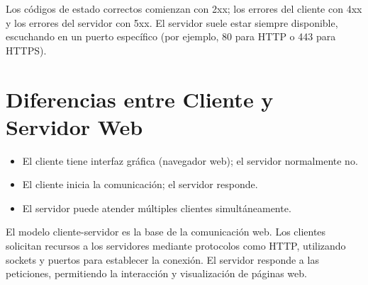 \documentclass[11pt,a4paper]{article}
\begin{document}
    \begin{NotaBox}
        Los códigos de estado correctos comienzan con 2xx; los errores del cliente con 4xx y los errores del servidor con 5xx.
        El servidor suele estar siempre disponible, escuchando en un puerto específico (por ejemplo, 80 para HTTP o 443 para HTTPS).
    \end{NotaBox}

    \section{Diferencias entre Cliente y Servidor Web}
    \begin{itemize}
        \item El cliente tiene interfaz gráfica (navegador web); el servidor normalmente no.
        \item El cliente inicia la comunicación; el servidor responde.
        \item El servidor puede atender múltiples clientes simultáneamente.
    \end{itemize}

    \begin{ResumenBox}
        El modelo cliente-servidor es la base de la comunicación web. Los clientes solicitan recursos a los servidores mediante protocolos como HTTP, utilizando sockets y puertos para establecer la conexión. El servidor responde a las peticiones, permitiendo la interacción y visualización de páginas web.
    \end{ResumenBox}
\end{document}
